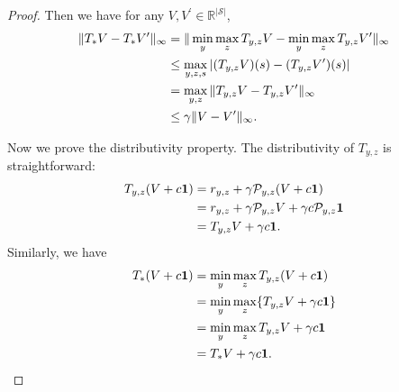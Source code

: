 \documentclass{article}
\theoremstyle{plain}
\theoremstyle{definition}
\theoremstyle{remark}
\def\cP{\mathcal P}
\begin{document}
\begin{proof}
    Then we have for any $V, V^\prime \in \mathbb{R}^{|\mathcal{S}|}$,
    \begin{align}
        \|T_{*} V - T_{*} V^\prime\|_\infty & = \| \min_{y} \max_{z} T_{y,z} V - \min_{y} \max_{z} T_{y,z} V^\prime \|_\infty \notag\\
        & \le \max_{y,z,s} | (T_{y,z} V)(s) - (T_{y,z} V^\prime)(s) |\notag \\
        & = \max_{y,z} \| T_{y,z} V - T_{y,z} V^\prime \|_\infty\notag \\
        & \le \gamma \| V - V^\prime \|_\infty.
    \end{align}

    Now we prove the distributivity property.
    The distributivity of $T_{y,z}$ is straightforward:
    \begin{align}
        T_{y,z} (V + c \mathbf{1}) & = r_{y,z} + \gamma \cP_{y,z} (V + c \mathbf{1})\notag \\
        & = r_{y,z} + \gamma \cP_{y,z} V + \gamma c \cP_{y,z} \mathbf{1} \notag\\
        & = T_{y,z} V + \gamma c \mathbf{1}.
    \end{align}
    Similarly, we have
    \begin{align}
        T_{*} (V + c \mathbf{1}) & = \min_{y} \max_{z} T_{y,z} (V + c \mathbf{1})\notag \\
        & = \min_{y} \max_{z} \{ T_{y,z} V + \gamma c \mathbf{1} \} \notag\\
        & = \min_{y} \max_{z} T_{y,z} V + \gamma c \mathbf{1}\notag \\
        & = T_{*} V + \gamma c \mathbf{1}.
    \end{align}
\end{proof}
\end{document}
